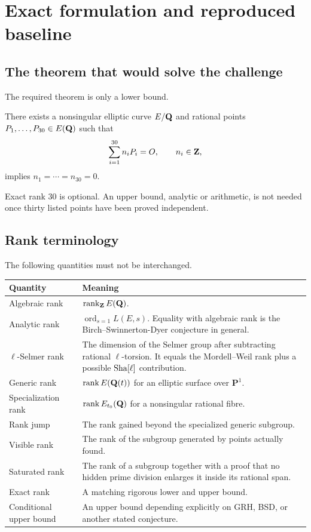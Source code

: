 \section{Exact formulation and reproduced baseline}

\subsection{The theorem that would solve the challenge}

The required theorem is only a lower bound.

\begin{theorem}
There exists a nonsingular elliptic curve $E/\mathbf Q$ and rational points
$P_1,\ldots,P_{30}\in E(\mathbf Q)$ such that
\[
  \sum_{i=1}^{30}n_iP_i=O,\qquad n_i\in\mathbf Z,
\]
implies $n_1=\cdots=n_{30}=0$.
\end{theorem}

Exact rank $30$ is optional.  An upper bound, analytic or arithmetic, is not
needed once thirty listed points have been proved independent.

\subsection{Rank terminology}

The following quantities must not be interchanged.

\begin{longtable}{p{}p{}}
\toprule
Quantity & Meaning \\
\midrule
\endhead
Algebraic rank & $\operatorname{rank}_{\mathbf Z}E(\mathbf Q)$. \\
Analytic rank & $\operatorname{ord}_{s=1}L(E,s)$.  Equality with algebraic rank is the Birch--Swinnerton-Dyer conjecture in general. \\
$\ell$-Selmer rank & The dimension of the Selmer group after subtracting rational $\ell$-torsion.  It equals the Mordell--Weil rank plus a possible $\operatorname{Sha}[\ell]$ contribution. \\
Generic rank & $\operatorname{rank} E(\mathbf Q(t))$ for an elliptic surface over $\mathbf P^1$. \\
Specialization rank & $\operatorname{rank} E_{t_0}(\mathbf Q)$ for a nonsingular rational fibre. \\
Rank jump & The rank gained beyond the specialized generic subgroup. \\
Visible rank & The rank of the subgroup generated by points actually found. \\
Saturated rank & The rank of a subgroup together with a proof that no hidden prime division enlarges it inside its rational span. \\
Exact rank & A matching rigorous lower and upper bound. \\
Conditional upper bound & An upper bound depending explicitly on GRH, BSD, or another stated conjecture. \\
\bottomrule
\end{longtable}

